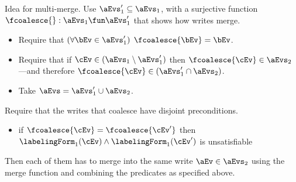 Idea for multi-merge.  Use $\aEvs_1'\subseteq\aEvs_1$, with a surjective function
$\fcoalesce{}:\aEvs_1\fun\aEvs_1'$ that shows how writes merge.
\begin{itemize}
\item Require that $(\forall\bEv\in\aEvs_1')$ $\fcoalesce{\bEv}=\bEv$.
\item Require that if $\cEv\in(\aEvs_1\setminus\aEvs_1')$ then
  $\fcoalesce{\cEv}\in\aEvs_2$---and therefore
  $\fcoalesce{\cEv}\in(\aEvs_1'\cap\aEvs_2)$.
\item Take $\aEvs=\aEvs_1'\cup\aEvs_2$.
\end{itemize}
Require that the writes that coalesce have disjoint preconditions.
\begin{itemize}
\item if $\fcoalesce{\cEv}=\fcoalesce{\cEv'}$ then $\labelingForm_1(\cEv)\land\labelingForm_1(\cEv')$ is unsatisfiable
\end{itemize}
Then each of them has to merge into the same write
$\aEv\in\aEvs_2$ using the merge function and combining the predicates as
specified above.


